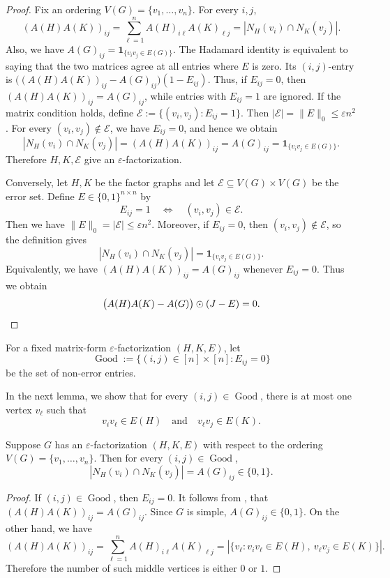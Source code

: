 \documentclass{file}
\newcommand{\eps}{\varepsilon}
\newcommand{\Good}{\operatorname{Good}}
\begin{document}
\begin{proof}
Fix an ordering $V(G)=\{v_1,\dots,v_n\}$.  For every $i,j$,
\[
  (A(H)A(K))_{ij}
  =
  \sum_{\ell=1}^n A(H)_{i\ell}A(K)_{\ell j}
  =
  |N_H(v_i)\cap N_K(v_j)|.
\]
Also, we have  $A(G)_{ij}=\mathbf 1_{\{v_iv_j\in E(G)\}}$.
The Hadamard identity is equivalent to saying that the two matrices agree at all entries where $E$ is zero.  Its $(i,j)$-entry is $\bigl((A(H)A(K))_{ij}-A(G)_{ij}\bigr)(1-E_{ij})$.
Thus, if $E_{ij}=0$, then $(A(H)A(K))_{ij}=A(G)_{ij}$,
while entries with $E_{ij}=1$ are ignored.
If the matrix condition holds, define $\mathcal E:=\{(v_i,v_j):E_{ij}=1\}$.
Then $|\mathcal E|=\|E\|_0\le \eps n^2$.
For every $(v_i,v_j)\notin\mathcal E$, we have $E_{ij}=0$, and hence we obtain
\[
  |N_H(v_i)\cap N_K(v_j)|
  =
  (A(H)A(K))_{ij}
  =
  A(G)_{ij}
  =
  \mathbf 1_{\{v_iv_j\in E(G)\}}.
\]
Therefore $H,K,\mathcal E$ give an $\eps$-factorization.

Conversely, let $H,K$ be the factor graphs and let
$\mathcal E\subseteq V(G)\times V(G)$
be the error set.  Define $E\in\{0,1\}^{n\times n}$ by
\[
  E_{ij}=1
  \quad\Longleftrightarrow\quad
  (v_i,v_j)\in\mathcal E.
\]
Then we have  $\|E\|_0=|\mathcal E|\le \eps n^2$.
Moreover, if $E_{ij}=0$, then $(v_i,v_j)\notin\mathcal E$, so the definition gives
\[
  |N_H(v_i)\cap N_K(v_j)|
  =
  \mathbf 1_{\{v_iv_j\in E(G)\}}.
\]
Equivalently, we have  $(A(H)A(K))_{ij}=A(G)_{ij}$ whenever $E_{ij}=0$.
Thus we obtain
\[
  \bigl(A(H)A(K)-A(G)\bigr)\odot (J-E)=0.\qedhere
\]
\end{proof}

\begin{defn}
For a fixed matrix-form $\eps$-factorization $(H,K,E)$, let
\[
  \Good:=\{(i,j)\in[n]\times[n]:E_{ij}=0\}
\]
be the set of non-error entries.
\end{defn}

In the next lemma, we show that for every $(i,j)\in\Good$, there is at most one vertex
$v_\ell$ such that
\[
  v_iv_\ell\in E(H)
  \quad\text{and}\quad
  v_\ell v_j\in E(K).
\]
\begin{lem}
\label{lem:unique-witness}
Suppose $G$ has an $\eps$-factorization $(H,K,E)$ with respect to the ordering $V(G)=\{v_1,\dots,v_n\}$.  Then for
every $(i,j)\in\Good$,
\[
  |N_H(v_i)\cap N_K(v_j)|=A(G)_{ij}\in\{0,1\}.
\]

\end{lem}

\begin{proof}
If $(i,j)\in\Good$, then $E_{ij}=0$.  
It follows from , that
$(A(H)A(K))_{ij}=A(G)_{ij}$.
Since $G$ is simple, $A(G)_{ij}\in\{0,1\}$.  
On the other hand, we have
\[
  (A(H)A(K))_{ij}
  =
  \sum_{\ell=1}^n A(H)_{i\ell}A(K)_{\ell j}
  =
  |\{v_\ell:v_iv_\ell\in E(H),\ v_\ell v_j\in E(K)\}|.
\]
Therefore the number of such middle vertices is either $0$ or $1$.
\end{proof}
\end{document}

